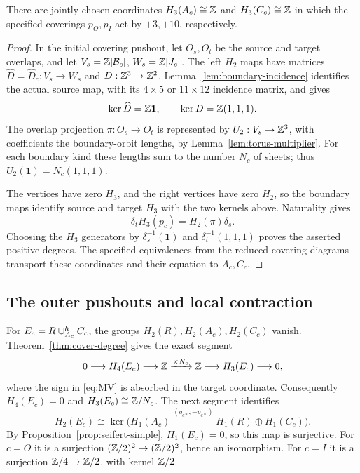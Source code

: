 \begin{theorem}\label{thm:cover-degree}
There are jointly chosen coordinates $H_3(A_c)\cong\mathbb Z$ and $H_3(C_c)\cong\mathbb Z$ in which the specified coverings $p_O,p_I$ act by $+3,+10$, respectively.
\end{theorem}
\begin{proof}
In the initial covering pushout, let $O_s,O_t$ be the source and target overlaps, and let $V_s=\mathbb Z[\mathcal B_c]$, $W_s=\mathbb Z[J_c]$. The left $H_2$ maps have matrices $\widehat D=\widehat D_c:V_s\to W_s$ and $D:\mathbb Z^3\to\mathbb Z^2$. Lemma~\ref{lem:boundary-incidence} identifies the actual source map, with its $4\times5$ or $11\times12$ incidence matrix, and gives
\[
\ker\widehat D=\mathbb Z\mathbf1,\qquad \ker D=\mathbb Z(1,1,1).
\]
The overlap projection $\pi:O_s\to O_t$ is represented by $U_2:V_s\to\mathbb Z^3$, with coefficients the boundary-orbit lengths, by Lemma~\ref{lem:torus-multiplier}. For each boundary kind these lengths sum to the number $N_c$ of sheets; thus $U_2(\mathbf1)=N_c(1,1,1)$.

The vertices have zero $H_3$, and the right vertices have zero $H_2$, so the boundary maps identify source and target $H_3$ with the two kernels above. Naturality gives
\[
\delta_t H_3(p_c)=H_2(\pi)\delta_s.
\]
Choosing the $H_3$ generators by $\delta_s^{-1}(\mathbf1)$ and $\delta_t^{-1}(1,1,1)$ proves the asserted positive degrees. The specified equivalences from the reduced covering diagrams transport these coordinates and their equation to $A_c,C_c$.
\end{proof}

\subsection{The outer pushouts and local contraction}

For $E_c=R\mathbin{\cup}^{h}_{A_c}C_c$, the groups $H_2(R),H_2(A_c),H_2(C_c)$ vanish. Theorem~\ref{thm:cover-degree} gives the exact segment
\[
0\longrightarrow H_4(E_c)\longrightarrow\mathbb Z
 \xrightarrow{\times N_c}\mathbb Z\longrightarrow H_3(E_c)\longrightarrow0,
\]
where the sign in \eqref{eq:MV} is absorbed in the target coordinate. Consequently $H_4(E_c)=0$ and $H_3(E_c)\cong\mathbb Z/N_c$. The next segment identifies
\[
H_2(E_c)\cong\ker\bigl(H_1(A_c)\xrightarrow{(q_{c*},-p_{c*})}
H_1(R)\oplus H_1(C_c)\bigr).
\]
By Proposition~\ref{prop:seifert-simple}, $H_1(E_c)=0$, so this map is surjective. For $c=O$ it is a surjection $(\mathbb Z/2)^2\to(\mathbb Z/2)^2$, hence an isomorphism. For $c=I$ it is a surjection $\mathbb Z/4\to\mathbb Z/2$, with kernel $\mathbb Z/2$.


